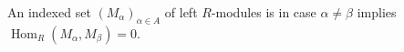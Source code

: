 An indexed set $(M_\alpha)_{\alpha \in A}$ of left $R$-modules is  in case $\alpha \neq \beta$ implies $\operatorname{Hom}_R(M_\alpha, M_\beta) = 0$.
